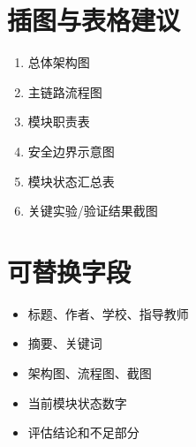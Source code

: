 \documentclass[UTF8,a4paper,12pt,oneside]{ctexrep}
\begin{document}
\chapter{插图与表格建议}

\begin{enumerate}
  \item 总体架构图
  \item 主链路流程图
  \item 模块职责表
  \item 安全边界示意图
  \item 模块状态汇总表
  \item 关键实验/验证结果截图
\end{enumerate}

\chapter{可替换字段}

\begin{itemize}
  \item 标题、作者、学校、指导教师
  \item 摘要、关键词
  \item 架构图、流程图、截图
  \item 当前模块状态数字
  \item 评估结论和不足部分
\end{itemize}
\end{document}
